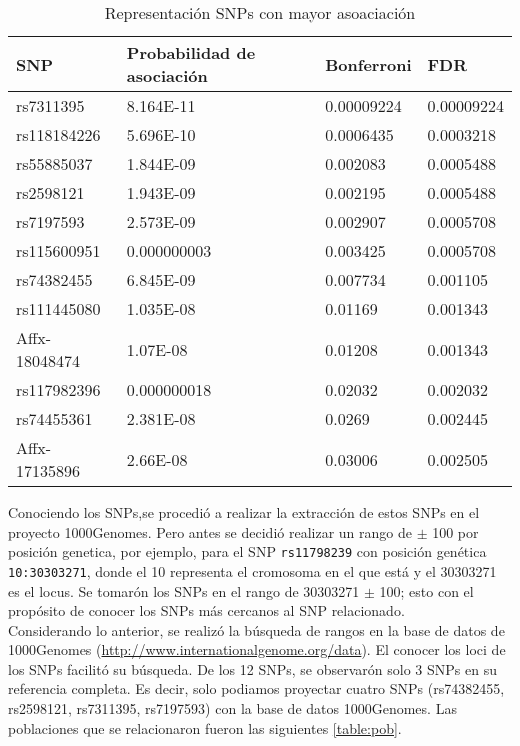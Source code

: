 \begin{table}[H]
  \centering
  \begin{tabular}{|l|l|l|l|}
    \hline
    \hline
    SNP&Probabilidad de asociaci\'on&Bonferroni&FDR \\
    \hline

    rs7311395&8.164E-11&0.00009224&0.00009224 \\
    rs118184226&5.696E-10&0.0006435&0.0003218\\
    rs55885037&1.844E-09&0.002083&0.0005488\\
    rs2598121&1.943E-09&0.002195&0.0005488\\
    rs7197593&2.573E-09&0.002907&0.0005708\\
    rs115600951&0.000000003&0.003425&0.0005708\\
    rs74382455&6.845E-09&0.007734&0.001105\\
    rs111445080&1.035E-08&0.01169&0.001343\\
    Affx-18048474&1.07E-08&0.01208&0.001343\\
    rs117982396&0.000000018&0.02032&0.002032\\
    rs74455361&2.381E-08&0.0269&0.002445\\
    Affx-17135896&2.66E-08&0.03006&0.002505\\
    \hline
  \end{tabular}
  \caption{Representaci\'on SNPs con mayor asoaciaci\'on}
  \label{table:1}
\end{table}
  

Conociendo los SNPs,se procedi\'o a realizar la extracci\'on de estos SNPs en el proyecto 1000Genomes. Pero antes se decidi\'o realizar un rango de $\pm$ 100  por posici\'on genetica, por ejemplo, para el SNP \texttt{rs11798239} con posici\'on gen\'etica \texttt{10:30303271}, donde el 10 representa el cromosoma en el que est\'a y el 30303271 es el locus. Se tomar\'on los SNPs en el rango de 30303271 $\pm$ 100; esto con el prop\'osito de conocer los SNPs m\'as cercanos al SNP relacionado. \\

Considerando lo anterior, se realiz\'o la b\'usqueda de rangos en la base de datos de 1000Genomes (\url{http://www.internationalgenome.org/data}). El conocer los loci de los SNPs facilit\'o su b\'usqueda. De los 12 SNPs, se observar\'on solo 3 SNPs en su referencia completa. Es decir, solo podiamos proyectar cuatro SNPs (rs74382455, rs2598121, rs7311395, rs7197593) con la base de datos 1000Genomes. Las poblaciones que se relacionaron fueron las siguientes \ref{table:pob}.\\

